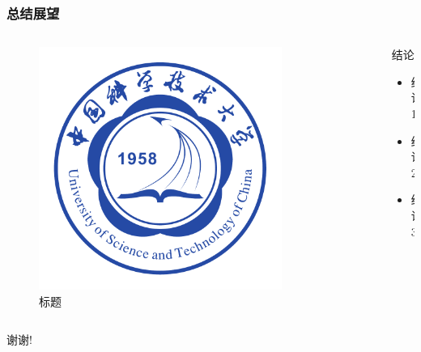\documentclass[12pt]{ctexbeamer}
\begin{document}
\begin{frame}
  \frametitle{总结展望}
  \begin{columns}
    \begin{column}{0.50\textwidth}
      \begin{figure}
        \includegraphics[width=0.8\textwidth]{figures/ustc_logo.pdf}
        \caption{标题}
      \end{figure}
    \end{column}
    \begin{column}{0.50\textwidth}
      \begin{block}{结论}
        \begin{itemize}
          \item 结论 1
          \item 结论 2
          \item 结论 3
        \end{itemize}
      \end{block}
    \end{column}
  \end{columns}
\end{frame}


\begin{frame}
  \centerline{\Large 谢谢!}
\end{frame}
\end{document}
